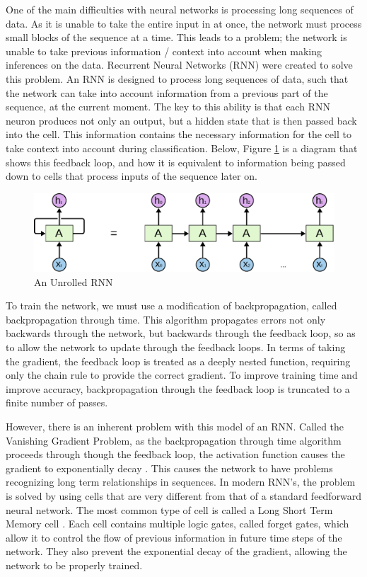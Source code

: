 \documentclass[pageno]{jpaper}
\begin{document}
\par
One of the main difficulties with neural networks is processing long sequences of data.  As it is unable to take the entire input in at once, the network must process small blocks of the sequence at a time.  This leads to a problem; the network is unable to take previous information / context into account when making inferences on the data.  Recurrent Neural Networks (RNN) were created to solve this problem.  An RNN is designed to process long sequences of data, such that the network can take into account information from a previous part of the sequence, at the current moment.  The key to this ability is that each RNN neuron produces not only an output, but a hidden state that is then passed back into the cell.  This information contains the necessary information for the cell to take context into account during classification.  Below, Figure \ref{fg:rnn} is a diagram that shows this feedback loop, and how it is equivalent to information being passed down to cells that process inputs of the sequence later on.

\begin{figure}[H]
	\centering
	\includegraphics[scale=0.9]{unrolledRNN.pdf}
	\caption{An Unrolled RNN \cite{olah:2015}}
	\label{fg:rnn}
\end{figure}

To train the network, we must use a modification of backpropagation, called backpropagation through time.  This algorithm propagates errors not only backwards through the network, but backwards through the feedback loop, so as to allow the network to update through the feedback loops.  In terms of taking the gradient, the feedback loop is treated as a deeply nested function, requiring only the chain rule to provide the correct gradient.  To improve training time and improve accuracy, backpropagation through the feedback loop is truncated to a finite number of passes.

\par
However, there is an inherent problem with this model of an RNN.  Called the Vanishing Gradient Problem, as the backpropagation through time algorithm proceeds through though the feedback loop, the activation function causes the gradient to exponentially decay \cite{bengio:1994}.  This causes the network to have problems recognizing long term relationships in sequences.  In modern RNN's, the problem is solved by using cells that are very different from that of a standard feedforward neural network.  The most common type of cell is called a Long Short Term Memory cell \cite{hochreiter:1997}.  Each cell contains multiple logic gates, called forget gates, which allow it to control the flow of previous information in future time steps of the network.  They also prevent the exponential decay of the gradient, allowing the network to be properly trained.
\end{document}
